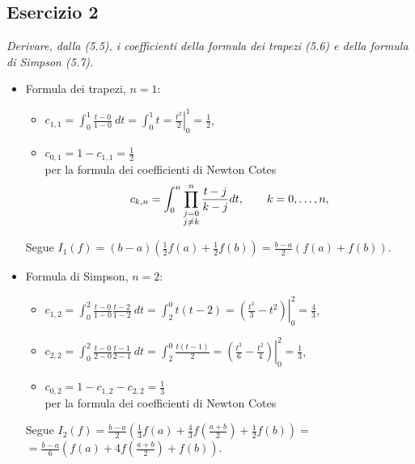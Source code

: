 \subsection{Esercizio 2}
\label{sub:es2}
\emph{Derivare, dalla (5.5), i coefficienti della formula dei trapezi (5.6) e della formula di Simpson (5.7).}
\begin{sol}
	\begin{itemize}
		\item Formula dei trapezi, $n=1$:
			\begin{itemize}
				\item $c_{1,1}=\int_0^1{\frac{t-0}{1-0}\:dt}=\int_0^1{t}=\left.\frac{t^2}{2}\right|_0^1=\frac{1}{2}$,\\
				\item $c_{0,1}=1-c_{1,1}=\frac{1}{2}$ \\
				per la formula dei coefficienti di Newton Cotes\\
				\vspace{1em}
				\begin{equation}
					c_{k,n}=\int_0^n \prod_{
						\begin{subarray}{c}
							j=0\\
							j\neq k
						\end{subarray}
						}^{n}\frac{t-j}{k-j} dt, \qquad k=0,\dots,n,
				\end{equation}
			\end{itemize}
			Segue $I_1(f)=(b-a)\left(\frac{1}{2}f(a)+\frac{1}{2}f(b)\right)=\frac{b-a}{2}\left(f(a)+f(b)\right)$.
		\item Formula di Simpson, $n=2$:
			\begin{itemize}
				\item $c_{1,2}=\int_0^2{\frac{t-0}{1-0}\frac{t-2}{1-2}\:dt}=\int_2^0{t(t-2)}=\left.\left(\frac{t^3}{3}-t^2\right)\right|_0^2=\frac{4}{3}$,
				\item $c_{2,2}=\int_0^2{\frac{t-0}{2-0}\frac{t-1}{2-1}\:dt}=\int_2^0{\frac{t(t-1)}{2}}=\left.\left(\frac{t^3}{6}-\frac{t^2}{4}\right)\right|_0^2=\frac{1}{3}$,
				\item $c_{0,2}=1-c_{1,2}-c_{2,2}=\frac{1}{3}$\\
				per la formula dei coefficienti di Newton Cotes
			\end{itemize}
			Segue $I_2(f)=\frac{b-a}{2}\left(\frac{1}{3}f(a)+\frac{4}{3}f\left(\frac{a+b}{2}\right)+\frac{1}{2}f(b)\right)=$\\ $=\frac{b-a}{6}\left(f(a)+4f\left(\frac{a+b}{2}\right)+f(b)\right)$.
	\end{itemize}
\end{sol}

